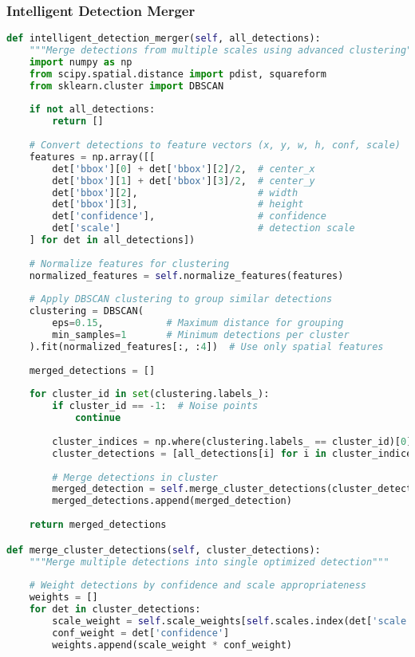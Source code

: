 \documentclass[a4paper,11pt]{article}
\begin{document}
\subsubsection{Intelligent Detection Merger}
\begin{lstlisting}[language=Python, caption=Advanced Detection Merging Algorithm]
def intelligent_detection_merger(self, all_detections):
    """Merge detections from multiple scales using advanced clustering"""
    import numpy as np
    from scipy.spatial.distance import pdist, squareform
    from sklearn.cluster import DBSCAN
    
    if not all_detections:
        return []
    
    # Convert detections to feature vectors (x, y, w, h, conf, scale)
    features = np.array([[ 
        det['bbox'][0] + det['bbox'][2]/2,  # center_x
        det['bbox'][1] + det['bbox'][3]/2,  # center_y  
        det['bbox'][2],                     # width
        det['bbox'][3],                     # height
        det['confidence'],                  # confidence
        det['scale']                        # detection scale
    ] for det in all_detections])
    
    # Normalize features for clustering
    normalized_features = self.normalize_features(features)
    
    # Apply DBSCAN clustering to group similar detections
    clustering = DBSCAN(
        eps=0.15,           # Maximum distance for grouping
        min_samples=1       # Minimum detections per cluster
    ).fit(normalized_features[:, :4])  # Use only spatial features
    
    merged_detections = []
    
    for cluster_id in set(clustering.labels_):
        if cluster_id == -1:  # Noise points
            continue
            
        cluster_indices = np.where(clustering.labels_ == cluster_id)[0]
        cluster_detections = [all_detections[i] for i in cluster_indices]
        
        # Merge detections in cluster
        merged_detection = self.merge_cluster_detections(cluster_detections)
        merged_detections.append(merged_detection)
    
    return merged_detections

def merge_cluster_detections(self, cluster_detections):
    """Merge multiple detections into single optimized detection"""
    
    # Weight detections by confidence and scale appropriateness
    weights = []
    for det in cluster_detections:
        scale_weight = self.scale_weights[self.scales.index(det['scale'])]
        conf_weight = det['confidence']
        weights.append(scale_weight * conf_weight)
    

\end{lstlisting}
\end{document}
